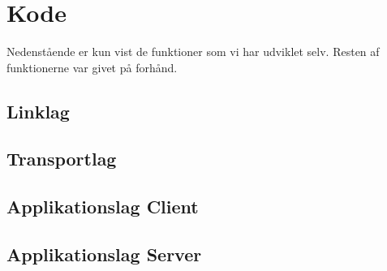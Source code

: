 \chapter{Kode}

Nedenstående er kun vist de funktioner som vi har udviklet selv. Resten af funktionerne var givet på forhånd.

\section{Linklag}

\section{Transportlag}

\section{Applikationslag Client}

\section{Applikationslag Server}

